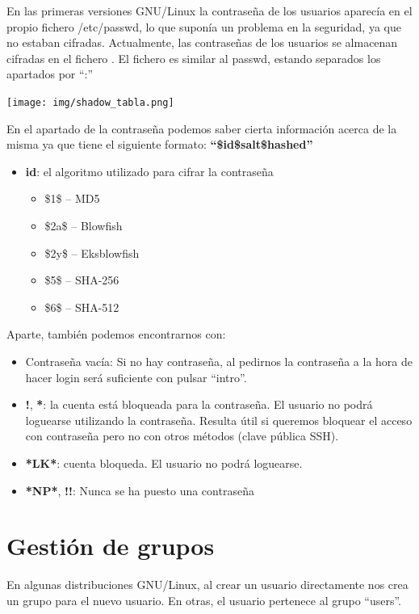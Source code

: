 \documentclass{../../../yukibook.cls/yukibook}
\begin{document}
En las primeras versiones GNU/Linux la contraseña de los usuarios aparecía en el propio fichero /etc/passwd, lo que suponía un problema en la seguridad, ya que no estaban cifradas. Actualmente, las contraseñas de los usuarios se almacenan cifradas en el fichero . El fichero es similar al passwd, estando separados los apartados por “:”


\begin{center}
  \texttt{[image: img/shadow\_tabla.png]}
\end{center}


En el apartado de la contraseña podemos saber cierta información acerca de la misma ya que tiene el siguiente formato: \textbf{“\$id\$salt\$hashed”}
\begin{itemize}
    \item \textbf{id}: el algoritmo utilizado para cifrar la contraseña
    \begin{itemize}
        \item \$1\$ – MD5
        \item \$2a\$ – Blowfish
        \item \$2y\$ – Eksblowfish
        \item \$5\$ – SHA-256
        \item \$6\$ – SHA-512
    \end{itemize}
\end{itemize}

Aparte, también podemos encontrarnos con:
\begin{itemize}
    \item Contraseña vacía:  Si no hay contraseña, al pedirnos la contraseña a la hora de hacer login será suficiente con pulsar “intro”.
    \item \textbf{!}, \textbf{*}: la cuenta está bloqueada para la contraseña. El usuario no podrá loguearse utilizando la contraseña. Resulta útil si queremos bloquear el acceso con contraseña pero no con otros métodos (clave pública SSH).
    \item \textbf{*LK*}: cuenta bloqueda. El usuario no podrá loguearse.
    \item \textbf{*NP*}, \textbf{!!}: Nunca se ha puesto una contraseña
\end{itemize}


\section{Gestión de grupos}
En algunas distribuciones GNU/Linux, al crear un usuario directamente nos crea un grupo para el nuevo usuario. En otras, el usuario pertenece al grupo “users”.
\end{document}
